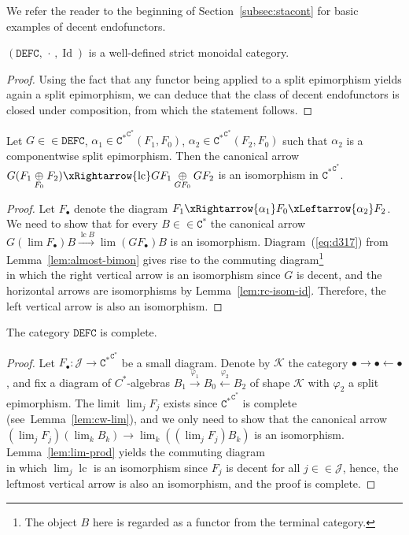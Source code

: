 \documentclass[10pt]{simplearticle}
\newcommand{\tikzinput}[1]{}
\newcommand{\Id}{\operatorname{Id}}
\newcommand{\DEFC}{\mathbb{\mathtt{DEFC}}}
\newcommand{\Cstar}{\mathtt{C^{*}}}
\newcommand{\EFC}{\Cstar^{\Cstar}}
\newcommand{\lc}{\operatorname{lc}}
\newcommand{\singledot}{\,\cdot\,}
\begin{document}
We refer the reader to the beginning of Section~\ref{subsec:stacont}
for basic examples of decent endofunctors.
\begin{prop}
$(\DEFC,\singledot,\Id)$ is a well-defined strict monoidal category.
\end{prop}

\begin{proof}
Using the fact that any functor being applied to a split epimorphism
yields again a split epimorphism, we can deduce that the class of
decent endofunctors is closed under composition, from which the statement
follows.
\end{proof}

\begin{lem}\label{lem:pullback-functors-and-c-algebras}
Let $G\in\in\DEFC$,
$\alpha_{1}\in\EFC(F_{1},F_{0})$, $\alpha_{2}\in\EFC(F_{2},F_{0})$
such that $\alpha_{2}$ is a componentwise split epimorphism. Then
the canonical arrow $G(F_{1}\underset{F_{0}}{\oplus}F_{2})\xRightarrow{\lc}GF_{1}\underset{GF_{0}}{\oplus}GF_{2}$
is an isomorphism in $\EFC$.
\end{lem}

\begin{proof}
Let $F_{\bullet}$ denote the diagram $F_{1}\xRightarrow{\alpha_{1}}F_{0}\xLeftarrow{\alpha_{2}}F_{2}$.
We need to show that for every $B\in\in\Cstar$ the canonical arrow
$G(\lim F_{\bullet})B\xrightarrow{\lc B}\lim(GF_{\bullet})B$ is an
isomorphism. Diagram~(\ref{eq:d317}) from Lemma~\ref{lem:almost-bimon}
gives rise to the commuting diagram\footnote{The object $B$ here is regarded as a functor from the terminal category.}
\[
\tikzinput{d343}
\]
in which the right vertical arrow is an isomorphism since $G$ is
decent, and the horizontal arrows are isomorphisms by Lemma~\ref{lem:rc-isom-id}.
Therefore, the left vertical arrow is also an isomorphism.
\end{proof}

\begin{prop}\label{prop:decent-complete}
The category $\DEFC$ is complete.
\end{prop}

\begin{proof}
Let $F_{\bullet}\colon\mathcal{J}\to\EFC$ be a small diagram. Denote
by $\mathcal{K}$ the category $\bullet\to\bullet\leftarrow\bullet$,
and fix a diagram of $C^{*}$-algebras $B_{1}\xrightarrow{\varphi_{1}}B_{0}\xleftarrow{\varphi_{2}}B_{2}$
of shape $\mathcal{K}$ with $\varphi_{2}$ a split epimorphism. The
limit $\lim_{j}F_{j}$ exists since $\EFC$ is complete (see~Lemma~\ref{lem:cw-lim}),
and we only need to show that the canonical arrow $(\lim_{j}F_{j})(\lim_{k}B_{k})\to\lim_{k}((\lim_{j}F_{j})B_{k})$
is an isomorphism. Lemma~\ref{lem:lim-prod} yields the commuting
diagram
\[
\tikzinput{d342}
\]
in which $\lim_{j}\lc$ is an isomorphism since $F_{j}$ is decent
for all $j\in\in\mathcal{J}$, hence, the leftmost vertical arrow
is also an isomorphism, and the proof is complete.
\end{proof}
\end{document}
